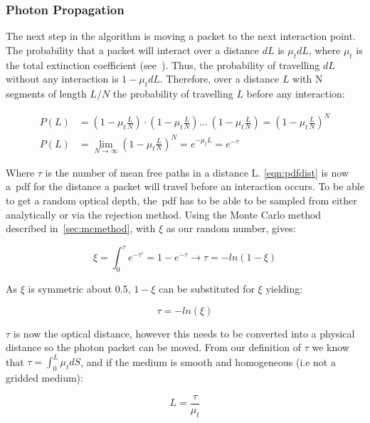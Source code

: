 \subsubsection*{Photon Propagation}\label{sec:photmove}

The next step in the algorithm is moving a packet to the next interaction point. The probability that a packet will interact over a distance $dL$ is $\mu_tdL$, where $\mu_t$ is the total extinction coefficient (see~). Thus, the probability of travelling $dL$ without any interaction is $1-\mu_tdL$. Therefore, over a distance $L$ with N segments of length $L/N$ the probability of travelling $L$ before any interaction:

\begin{align}
P(L) &= (1-\mu_t\frac{L}{N}) \cdot (1-\mu_t\frac{L}{N}) ...\ (1-\mu_t\frac{L}{N}) = (1-\mu_t\frac{L}{N})^N \\
P(L) &= \lim_{N \to \infty}(1-\mu_t\frac{L}{N})^N=e^{-\mu_tL}=e^{-\tau}\label{eqn:pdfdist}
\end{align}

Where $\tau$ is the number of mean free paths in a distance L. \cref{eqn:pdfdist} is now a~\gls*{pdf} for the distance a packet will travel before an interaction occurs. To be able to get a random optical depth, the~\gls*{pdf} has to be able to be sampled from either analytically or via the rejection method.
Using the Monte Carlo method described in~\cref{sec:mcmethod}, with $\xi$ as our random number, gives:

\begin{equation}
\xi=\int_{0}^{\tau}e^{-\tau'}=1-e^{-\tau}\rightarrow \tau=-ln(1-\xi)
\end{equation}

As $\xi$ is symmetric about 0.5, $1-\xi$ can be substituted for $\xi$ yielding:

\begin{equation}
\tau=-ln(\xi)\label{eqn:taueqn}
\end{equation} 

$\tau$ is now the optical distance, however this needs to be converted into a physical distance so the photon packet can be moved. From our definition of $\tau$ we know that $\tau=\int_0^L\mu_tdS$, and if the medium is smooth and homogeneous (i.e not a gridded medium): 

\begin{equation}
L=\frac{\tau}{\mu_t}\label{eqn:physicaldist}
\end{equation}

